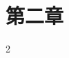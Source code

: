 \documentclass[supercite]{../upcthesis}
\begin{document}
\fi

\section{第二章}

2





\ifx\compileAllFiles\undefined
\end{document}
